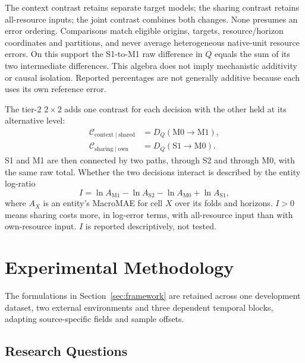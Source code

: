 \documentclass[5p,twocolumn]{elsarticle}
\begin{document}
The context contrast retains separate target models; the sharing contrast
retains all-resource inputs; the joint contrast combines both changes.
None presumes an error ordering. Comparisons match eligible origins, targets,
resource/horizon coordinates and partitions, and never average heterogeneous
native-unit resource errors. On this support the S1-to-M1 raw difference in
$Q$ equals the sum of its two intermediate differences. This algebra does
not imply mechanistic additivity or causal isolation. Reported percentages
are not generally additive because each uses its own reference error.

The tier-2 $2\times2$ adds one contrast for each decision with the other
held at its alternative level:
\begin{equation}
  \begin{aligned}
    \mathcal{C}_{\mathrm{context}\mid\mathrm{shared}}
      &= D_Q(\mathrm{M0}\rightarrow\mathrm{M1}), \\
    \mathcal{C}_{\mathrm{sharing}\mid\mathrm{own}}
      &= D_Q(\mathrm{S1}\rightarrow\mathrm{M0}).
  \end{aligned}
  \label{eq:tier2-contrasts}
\end{equation}
S1 and M1 are then connected by two paths, through S2 and through M0, with
the same raw total. Whether the two decisions interact is described by the
entity log-ratio
\begin{equation}
  I=\ln A_{\mathrm{M1}}-\ln A_{\mathrm{S2}}-\ln A_{\mathrm{M0}}
    +\ln A_{\mathrm{S1}},
  \label{eq:interaction}
\end{equation}
where $A_X$ is an entity's MacroMAE for cell $X$ over its folds and horizons.
$I>0$ means sharing costs more, in log-error terms, with all-resource input
than with own-resource input. $I$ is reported descriptively, not tested.

\section{Experimental Methodology}
\label{sec:methodology}

The formulations in Section~\ref{sec:framework} are retained across one
development dataset, two external environments and three dependent temporal
blocks, adapting source-specific fields and sample offsets.

\subsection{Research Questions}
\label{sec:research-questions}
\end{document}

